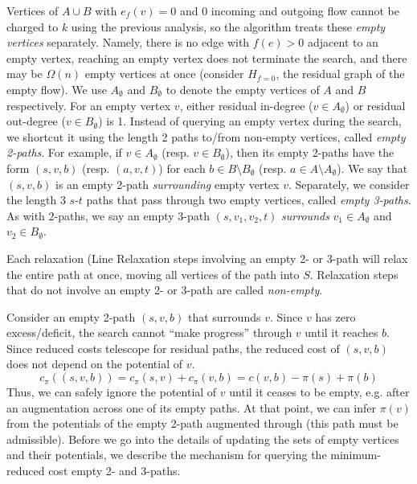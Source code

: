 \documentclass[11pt]{article}
\theoremstyle{plain}
\begin{document}
\begin{figure*}
Vertices of $A \cup B$ with $e_f(v) = 0$ and 0 incoming and outgoing flow
cannot be charged to $k$ using the previous analysis, so the algorithm treats
these \emph{empty vertices} separately.
Namely, there is no edge with $f(e) > 0$ adjacent to an empty vertex,
reaching an empty vertex does not terminate the search, and there may be
$\Omega(n)$ empty vertices at once (consider $H_{f = 0}$, the residual graph
of the empty flow).
We use $A_\emptyset$ and $B_\emptyset$ to denote the empty vertices of $A$ and
$B$ respectively.
For an empty vertex $v$, either residual in-degree ($v \in A_\emptyset$) or
residual out-degree ($v \in B_\emptyset$) is 1.
Instead of querying an empty vertex during the search, we shortcut it using the
length 2 paths to/from non-empty vertices, called \emph{empty 2-paths}.
For example, if $v \in A_\emptyset$ (resp. $v \in B_\emptyset$), then its empty
2-paths have the form $(s, v, b)$ (resp. $(a, v, t)$) for each
$b \in B \setminus B_\emptyset$ (resp. $a \in A \setminus A_\emptyset$).
We say that $(s, v, b)$ is an empty 2-path \emph{surrounding} empty vertex $v$.
Separately, we consider the length 3 $s$-$t$ paths that pass through two empty
vertices, called \emph{empty 3-paths}.
As with 2-paths, we say an empty 3-path $(s, v_1, v_2, t)$ \emph{surrounds}
$v_1 \in A_\emptyset$ and $v_2 \in B_\emptyset$.

Each relaxation (Line
Relaxation steps involving an empty 2- or 3-path will relax the entire path
at once, moving all vertices of the path into $S$.
Relaxation steps that do not involve an empty 2- or 3-path are called
\emph{non-empty}.

Consider an empty 2-path $(s, v, b)$ that surrounds $v$.
Since $v$ has zero excess/deficit, the search cannot ``make progress'' through
$v$ until it reaches $b$.
Since reduced costs telescope for residual paths, the reduced cost of
$(s, v, b)$ does not depend on the potential of $v$.
\begin{equation*}
	c_\pi((s, v, b)) = c_\pi(s, v) + c_\pi(v, b) = c(v, b) - \pi(s) + \pi(b)
\end{equation*}
Thus, we can safely ignore the potential of $v$ until it ceases to be
empty, e.g. after an augmentation across one of its empty paths.
At that point, we can infer $\pi(v)$ from the potentials of the empty 2-path
augmented through (this path must be admissible).
Before we go into the details of updating the sets of empty vertices and their
potentials, we describe the mechanism for querying the minimum-reduced cost
empty 2- and 3-paths.


\end{figure*}
\end{document}
